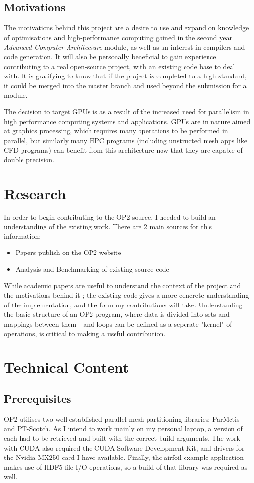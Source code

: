 \documentclass[11pt]{article}
\begin{document}
\subsection*{Motivations}
The motivations behind this project are a desire to use and expand on knowledge of optimisations and high-performance computing gained in the second year \textit{Advanced Computer Architecture} module, as well as an interest in compilers and code generation. It will also be personally beneficial to gain experience contributing to a real open-source project, with an existing code base to deal with. It is gratifying to know that if the project is completed to a high standard, it could be merged into the master branch and used beyond the submission for a module.
\par The decision to target GPUs is as a result of the increased need for parallelism in high performance computing systems and applications. GPUs are in nature aimed at graphics processing, which requires many operations to be performed in parallel, but similarly many HPC programs (including unstructed mesh apps like CFD programs) can benefit from this architecture now that they are capable of double precision.
\section*{Research}
In order to begin contributing to the OP2 source, I needed to build an understanding of the existing work. There are 2 main sources for this information:
\begin{itemize}
 \item{Papers publish on the OP2 website}
 \item{Analysis and Benchmarking of existing source code}
\end{itemize}
While academic papers are useful to understand the context of the project and the motivations behind it \cite{op2main} \cite{autoVector} \cite{industrial}; the existing code gives a more concrete understanding of the implementation, and the form my contributions will take. Understanding the basic structure of an OP2 program, where data is divided into sets and mappings between them - and loops can be defined as a seperate "kernel" of operations, is critical to making a useful contribution. 

\section*{Technical Content}
\subsection*{Prerequisites}
OP2 utilises two well established parallel mesh partitioning libraries: ParMetis\cite{metis} and PT-Scotch\cite{scotch}. As I intend to work mainly on my personal laptop, a version of each had to be retrieved and built with the correct build arguments. The work with CUDA also required the CUDA Software Development Kit\cite{cuda}, and drivers for the Nvidia MX250 card I have available. Finally, the airfoil example application makes use of HDF5 file I/O operations, so a build of that library was required as well. 
\end{document}

